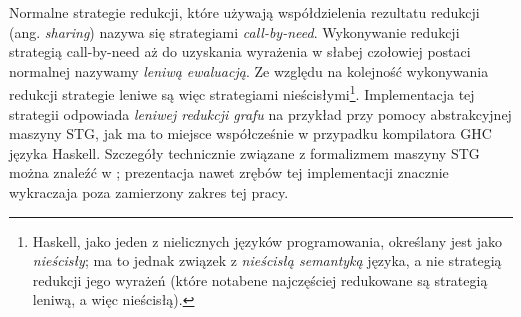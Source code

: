Normalne strategie redukcji, które używają współdzielenia rezultatu redukcji (ang. \emph{sharing}) nazywa się strategiami \emph{call-by-need}. Wykonywanie redukcji strategią call-by-need aż do uzyskania wyrażenia w słabej czołowiej postaci normalnej nazywamy \emph{leniwą ewaluacją}. Ze względu na kolejność wykonywania redukcji strategie leniwe są więc strategiami nieścisłymi\footnote{Haskell, jako jeden z nielicznych języków programowania, określany jest jako \emph{nieścisły}; ma to jednak związek z \emph{nieścisłą semantyką} języka, a nie strategią redukcji jego wyrażeń (które notabene najczęściej redukowane są strategią leniwą, a więc nieścisłą).}. Implementacja tej strategii odpowiada \emph{leniwej redukcji grafu} \cite[Rozdział 12.1, str. 212]{PeytonJones:1987:IFP:1096899} na przykład przy pomocy abstrakcyjnej maszyny STG, jak ma to miejsce współcześnie w przypadku kompilatora GHC języka Haskell. Szczegóły technicznie związane z formalizmem maszyny STG można znaleźć w \cite{jones1992implementing}; prezentacja nawet zrębów tej implementacji znacznie wykraczaja poza zamierzony zakres tej pracy. 


